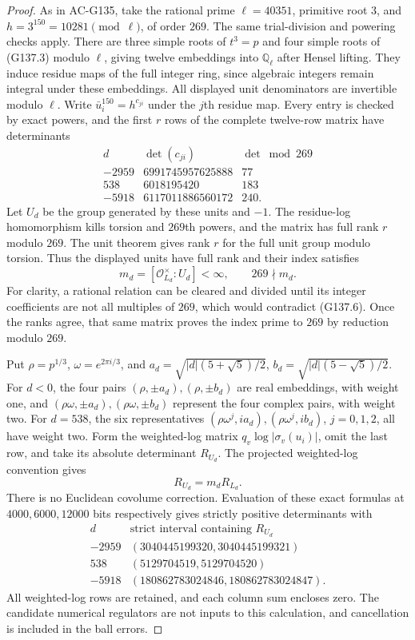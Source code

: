 \begin{proof}
As in AC-G135, take the rational prime $\ell=40351$, primitive
root $3$, and $h=3^{150}=10281\pmod\ell$, of order $269$.
The same trial-division and powering checks apply.
There are three simple roots of $t^3=p$ and four simple roots
of (G137.3) modulo $\ell$, giving twelve embeddings into
$\mathbb Q_\ell$ after Hensel lifting.
They induce residue maps of the full integer ring, since
algebraic integers remain integral under these embeddings.
All displayed unit denominators are invertible modulo $\ell$.
Write $\bar u_i^{150}=h^{c_{ji}}$ under the $j$th residue map.
Every entry is checked by exact powers, and the first $r$ rows
of the complete twelve-row matrix have determinants
\[
\begin{array}{c|r|r}
d&\det(c_{ji})&\det\bmod269\\\hline
-2959&6991745957625888&77\\
538&6018195420&183\\
-5918&6117011886560172&240.
\end{array}
\tag{G137.6}
\]
Let $U_d$ be the group generated by these units and $-1$.
The residue-log homomorphism kills torsion and $269$th powers,
and the matrix has full rank $r$ modulo $269$.
The unit theorem gives rank $r$ for the full unit group modulo
torsion.  Thus the displayed units have full rank and their index
satisfies
\[
 m_d=[\mathcal O_{L_d}^{\times}:U_d]<\infty,
                   \qquad 269\nmid m_d.
 \tag{G137.7}
\]
For clarity, a rational relation can be cleared and divided until
its integer coefficients are not all multiples of $269$, which
would contradict (G137.6).  Once the ranks agree, that same matrix
proves the index prime to $269$ by reduction modulo $269$.

Put $\rho=p^{1/3}$, $\omega=e^{2\pi i/3}$, and
$a_d=\sqrt{|d|(5+\sqrt5)/2}$,
$b_d=\sqrt{|d|(5-\sqrt5)/2}$.
For $d<0$, the four pairs $(\rho,\pm a_d),(\rho,\pm b_d)$
are real embeddings, with weight one, and
$(\rho\omega,\pm a_d),(\rho\omega,\pm b_d)$ represent the
four complex pairs, with weight two.
For $d=538$, the six representatives
$(\rho\omega^j,ia_d),(\rho\omega^j,ib_d)$, $j=0,1,2$,
all have weight two.
Form the weighted-log matrix $q_v\log|\sigma_v(u_i)|$, omit
the last row, and take its absolute determinant $R_{U_d}$.
The projected weighted-log convention gives
\[
                         R_{U_d}=m_dR_{L_d}.
 \tag{G137.8}
\]
There is no Euclidean covolume correction.
Evaluation of these exact formulas at $4000,6000,12000$ bits
respectively gives strictly positive determinants with
\[
\begin{array}{c|c}
d&\text{strict interval containing }R_{U_d}\\\hline
-2959&(3040445199320,3040445199321)\\
538&(5129704519,5129704520)\\
-5918&(180862783024846,180862783024847).
\end{array}
\tag{G137.9}
\]
All weighted-log rows are retained, and each column sum encloses
zero.  The candidate numerical regulators are not inputs to this
calculation, and cancellation is included in the ball errors.


\end{proof}
